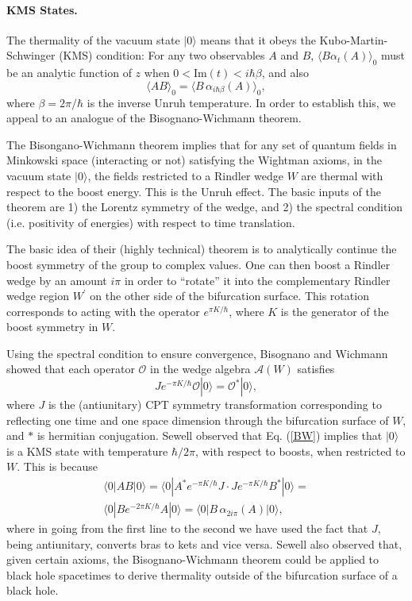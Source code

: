 \documentclass{article}
\begin{document}
\paragraph{KMS States.}  The thermality of the vacuum state $|0\rangle$ means that it obeys the Kubo-Martin-Schwinger (KMS) condition: For any two observables $A$ and $B$, $\langle B \alpha_{t}(A) \rangle_0$ must be an analytic function of $z$ when $0 < \textrm{Im}(t) < i \hbar \beta$, and also
\begin{equation}\label{KMS}
\langle AB \rangle_0 = \langle B\,\alpha_{i \hbar \beta}(A) \rangle_0,
\end{equation}
where $\beta = 2\pi / \hbar$ is the inverse Unruh temperature.  In order to establish this, we appeal to an analogue of the Bisognano-Wichmann theorem.

The Bisongano-Wichmann theorem \cite{BW76} implies that for any set of quantum fields in Minkowski space (interacting or not) satisfying the Wightman axioms, in the vacuum state $|0\rangle$, the fields restricted to a Rindler wedge $W$ are thermal with respect to the boost energy.  This is the Unruh effect.  The basic inputs of the theorem are 1) the Lorentz symmetry of the wedge, and 2) the spectral condition (i.e. positivity of energies) with respect to time translation.

The basic idea of their (highly technical) theorem is to analytically continue the boost symmetry of the group to complex values.  One can then boost a Rindler wedge by an amount $i\pi$ in order to ``rotate'' it into the complementary Rindler wedge region $W^\prime$ on the other side of the bifurcation surface.  This rotation corresponds to acting with the operator $e^{\pi K /\hbar}$, where $K$ is the generator of the boost symmetry in $W$.

Using the spectral condition to ensure convergence, Bisognano and Wichmann showed that each operator $\mathcal{O}$ in the wedge algebra $\mathcal{A}(W)$ satisfies
\begin{equation}\label{BW}
J e^{-\pi K / \hbar} \mathcal{O} |0\rangle = \mathcal{O}^* |0\rangle,
\end{equation}
where $J$ is the (antiunitary) CPT symmetry transformation corresponding to reflecting one time and one space dimension through the bifurcation surface of $W$, and $*$ is hermitian conjugation.  Sewell \cite{sewell80} observed that Eq. (\ref{BW}) implies that $|0\rangle$ is a KMS state with temperature $\hbar / 2\pi$, with respect to boosts, when restricted to $W$.  This is because
\begin{eqnarray}
\langle 0| AB |0\rangle = \langle 0| A^* e^{-\pi K/\hbar} J \cdot J e^{-\pi K/\hbar} B^* |0\rangle = \\
\langle 0| B e^{-2\pi K/\hbar} A |0\rangle = \langle 0| B\,\alpha_{2i\pi}(A) |0\rangle,
\end{eqnarray}
where in going from the first line to the second we have used the fact that $J$, being antiunitary, converts bras to kets and vice versa.  Sewell also observed that, given certain axioms, the Bisognano-Wichmann theorem could be applied to black hole spacetimes to derive thermality outside of the bifurcation surface of a black hole.
\end{document}

